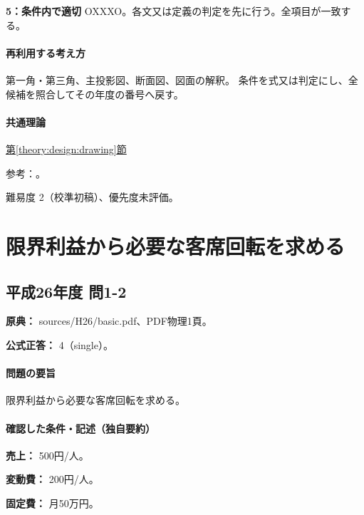 \noindent\textbf{5：条件内で適切} OXXXO。各文又は定義の判定を先に行う。全項目が一致する。\par

\paragraph{再利用する考え方} 第一角・第三角、主投影図、断面図、図面の解釈。 条件を式又は判定にし、全候補を照合してその年度の番号へ戻す。

\paragraph{共通理論} \hyperref[theory:design:drawing]{第\ref*{theory:design:drawing}節}

\par 参考：\cite{design48_iso}。

\par 難易度 2（校準初稿）、優先度未評価。

\section{限界利益から必要な客席回転を求める}

\subsection{平成26年度 問1-2}
\label{q:h26-reg-basic-1-2}

\noindent\textbf{原典：} sources/H26/basic.pdf、PDF物理1頁。

\textbf{公式正答：} 4（single）。

\paragraph{問題の要旨} 限界利益から必要な客席回転を求める。

\paragraph{確認した条件・記述（独自要約）}\mbox{}\par

\noindent\textbf{売上：} 500円/人。\par

\noindent\textbf{変動費：} 200円/人。\par

\noindent\textbf{固定費：} 月50万円。\par

